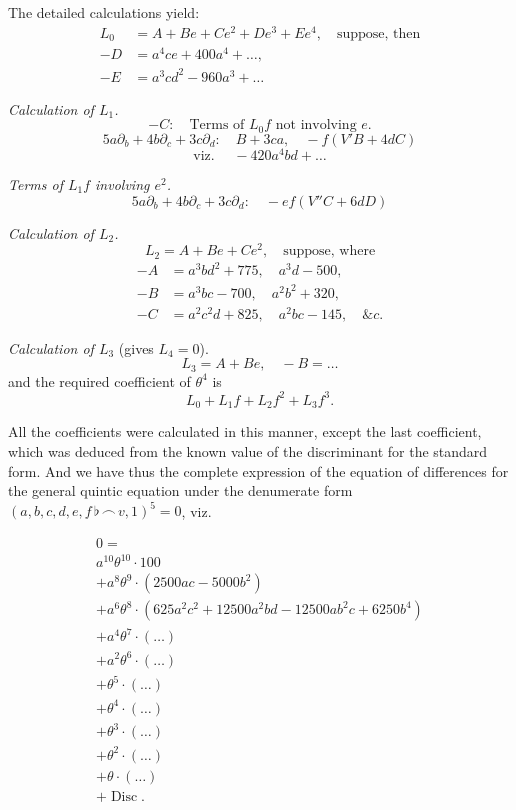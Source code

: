 \documentclass[11pt,a4paper]{book}
\providecommand{\Disc}{\mathop{\mathrm{Disc}}\nolimits}
\begin{document}
The detailed calculations yield:
\begin{align*}
L_0 &= A+Be+Ce^2+De^3+Ee^4,\quad\text{suppose, then}\\
-D &= a^4ce+400a^4+\ldots,\\
-E &= a^3cd^2-960a^3+\ldots
\end{align*}

\textit{Calculation of $L_1$.}
\[
-C:\quad \text{Terms of }L_0f\text{ not involving }e.
\]
\[
5a\partial_b+4b\partial_c+3c\partial_d:\quad B+3ca,\quad -f(V'B+4dC)
\]
\[
\text{viz. }\quad -420a^4bd+\ldots
\]

\textit{Terms of $L_1f$ involving $e^2$.}
\[
5a\partial_b+4b\partial_c+3c\partial_d:\quad -ef(V''C+6dD)
\]

\textit{Calculation of $L_2$.}
\[
L_2=A+Be+Ce^2,\quad\text{suppose, where}
\]
\begin{align*}
-A &= a^3bd^2+775,\quad a^3d-500,\\
-B &= a^3bc-700,\quad a^2b^2+320,\\
-C &= a^2c^2d+825,\quad a^2bc-145,\quad\&c.
\end{align*}

\textit{Calculation of $L_3$} (gives $L_4=0$).
\[
L_3=A+Be,\quad -B=\ldots
\]
and the required coefficient of $\theta^4$ is
\[
L_0+L_1f+L_2f^2+L_3f^3.
\]

All the coefficients were calculated in this manner, except the last coefficient, which was deduced from the known value of the discriminant for the standard form. And we have thus the complete expression of the equation of differences for the general quintic equation under the denumerate form $(a,b,c,d,e,f\,\flat\,\frown\, v,1)^5=0$, viz.

\vspace{6pt}
\noindent{}

\small
\begin{multline*}
0=\\
a^{10}\theta^{10}\cdot100\\
+a^8\theta^9\cdot(2500ac-5000b^2)\\
+a^6\theta^8\cdot(625a^2c^2+12500a^2bd-12500ab^2c+6250b^4)\\
+a^4\theta^7\cdot(\ldots)\\
+a^2\theta^6\cdot(\ldots)\\
+\theta^5\cdot(\ldots)\\
+\theta^4\cdot(\ldots)\\
+\theta^3\cdot(\ldots)\\
+\theta^2\cdot(\ldots)\\
+\theta\cdot(\ldots)\\
+\Disc.
\end{multline*}
\normalsize
\end{document}
